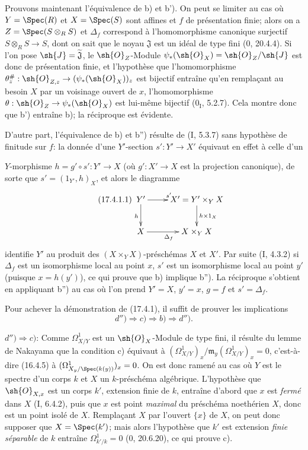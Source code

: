 Prouvons maintenant l'équivalence de b) et b'). On peut se limiter au cas où $Y=\Spec(R)$ et $X=\Spec(S)$ sont affines et $f$ de présentation finie; alors on a $Z=\Spec(S\otimes_R S)$ et $\Delta_f$ correspond à l'homomorphisme canonique surjectif $S\otimes_R S\to S$, dont on sait que le noyau $\mathfrak{J}$ est un idéal de type fini (0, 20.4.4). Si l'on pose $\sh{J}=\widetilde{\mathfrak{J}}$, le $\sh{O}_Z$-Module $\psi_*(\sh{O}_X)=\sh{O}_Z/\sh{J}$ est donc de présentation finie, et l'hypothèse que l'homomorphisme $\theta_z^\#: \sh{O}_{Z,z}\to(\psi_*(\sh{O}_X))_z$ est bijectif entraîne qu'en remplaçant au besoin $X$ par un voisinage ouvert de $x$, l'homomorphisme $\theta:\sh{O}_Z\to\psi_*(\sh{O}_X)$ est lui-même bijectif ($0_{\mathrm I}$, 5.2.7). Cela montre donc que b') entraîne b); la réciproque est évidente.

D'autre part, l'équivalence de b) et b'') résulte de (I, 5.3.7) sans hypothèse de finitude sur $f$: la donnée d'une $Y'$-section $s':Y'\to X'$ équivaut en effet à celle d'un

$Y$-morphisme $h=g'\circ s':Y'\to X$ (où $g':X'\to X$ est la projection canonique), de sorte que $s'=(1_{Y'},h)_X$, et alors le diagramme
\[
\tag{17.4.1.1}
\label{IV.17.4.1.1}
\xymatrix{
Y' \ar[r]^{s'} \ar[d]_h & X'=Y'\times_Y X \ar[d]^{h\times 1_X}\\
X \ar[r]_{\Delta_f} & X\times_Y X
}
\]
identifie $Y'$ au produit des $(X\times_Y X)$-préschémas $X$ et $X'$. Par suite (I, 4.3.2) si $\Delta_f$ est un isomorphisme local au point $x$, $s'$ est un isomorphisme local au point $y'$ (puisque $x=h(y')$), ce qui prouve que b) implique b''). La réciproque s'obtient en appliquant b'') au cas où l'on prend $Y'=X$, $y'=x$, $g=f$ et $s'=\Delta_f$.

Pour achever la démonstration de (17.4.1), il suffit de prouver les implications
\[
d'')\Rightarrow c)\Rightarrow b)\Rightarrow d'').
\]

$d'')\Rightarrow c)$: Comme $\Omega^1_{X/Y}$ est un $\sh{O}_X$-Module de type fini, il résulte du lemme de Nakayama que la condition c) équivaut à $(\Omega^1_{X/Y})_x/\mathfrak{m}_y(\Omega^1_{X/Y})_x=0$, c'est-à-dire (16.4.5) à $(\Omega^1_{X_y/\Spec(k(y))})_x=0$. On est donc ramené au cas où $Y$ est le spectre d'un corps $k$ et $X$ un $k$-préschéma algébrique. L'hypothèse que $\sh{O}_{X,x}$ est un corps $k'$, extension finie de $k$, entraîne d'abord que $x$ est \emph{fermé} dans $X$ (I, 6.4.2), puis que $x$ est point \emph{maximal} du préschéma noethérien $X$, donc est un point isolé de $X$. Remplaçant $X$ par l'ouvert $\{x\}$ de $X$, on peut donc supposer que $X=\Spec(k')$; mais alors l'hypothèse que $k'$ est extension \emph{finie séparable} de $k$ entraîne $\Omega^1_{k'/k}=0$ (0, 20.6.20), ce qui prouve c).

